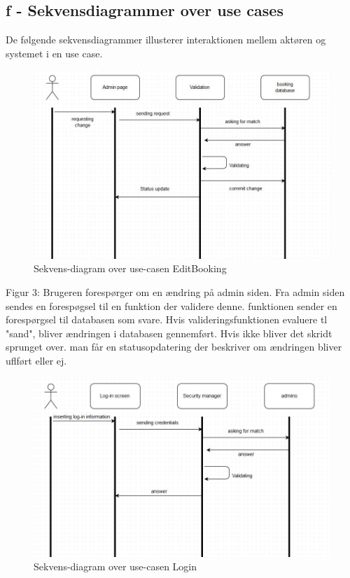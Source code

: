 \documentclass[12pt,a4paper]{article}
\begin{document}
\subsection{f - Sekvensdiagrammer over use cases}
De følgende sekvensdiagrammer illusterer interaktionen mellem aktøren og systemet i en use case.\\ 
\begin{figure}[H]
\centering
\includegraphics[scale=0.6]{adminInteraction.jpg}
\caption{Sekvens-diagram over use-casen EditBooking}
\end{figure}
Figur 3: Brugeren forespørger om en ændring på admin siden. 
Fra admin siden sendes en forespøgsel til en funktion der validere denne. 
funktionen sender en forespørgsel til databasen som svare.
Hvis valideringsfunktionen evaluere tl "sand", 
bliver ændringen i databasen gennemført.
Hvis ikke bliver det skridt sprunget over.
man får en statusopdatering der beskriver om ændringen bliver uflført eller ej.
\begin{figure}[H]
\centering
\includegraphics[scale=0.6]{adminLog-in.jpg}
\caption{Sekvens-diagram over use-casen Login}
\end{figure}
\end{document}
